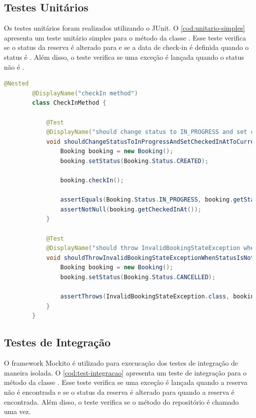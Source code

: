 \subsection{Testes Unitários}
Os testes unitários foram realizados utilizando o  JUnit. O \autoref{cod:unitario-simples} apresenta um teste unitário simples para o método  da classe . Esse teste verifica se o status da reserva é alterado para  e se a data de check-in é definida quando o status é . Além disso, o teste verifica se uma exceção é lançada quando o status não é .

\begin{codigo}[H]
    \begin{lstlisting}[language=Java]
        @Nested
        @DisplayName("checkIn method")
        class CheckInMethod {

            @Test
            @DisplayName("should change status to IN_PROGRESS and set checkedInAt to current time when status is CREATED")
            void shouldChangeStatusToInProgressAndSetCheckedInAtToCurrentTimeWhenStatusIsCreated() {
                Booking booking = new Booking();
                booking.setStatus(Booking.Status.CREATED);

                booking.checkIn();

                assertEquals(Booking.Status.IN_PROGRESS, booking.getStatus());
                assertNotNull(booking.getCheckedInAt());
            }

            @Test
            @DisplayName("should throw InvalidBookingStateException when status is not CREATED")
            void shouldThrowInvalidBookingStateExceptionWhenStatusIsNotCreated() {
                Booking booking = new Booking();
                booking.setStatus(Booking.Status.CANCELLED);

                assertThrows(InvalidBookingStateException.class, booking::checkIn);
            }
        }
    \end{lstlisting}
    \caption{Teste unitário simples}
    \label{cod:unitario-simples}
\end{codigo}

\subsection{Testes de Integração}
O framework Mockito é utilizado para execucação dos testes de integração de maneira isolada. O \autoref{cod:test-integracao} apresenta um teste de integração para o método  da classe . Esse teste verifica se uma exceção é lançada quando a reserva não é encontrada e se o status da reserva é alterado para  quando a reserva é encontrada. Além disso, o teste verifica se o método  do repositório é chamado uma vez.

